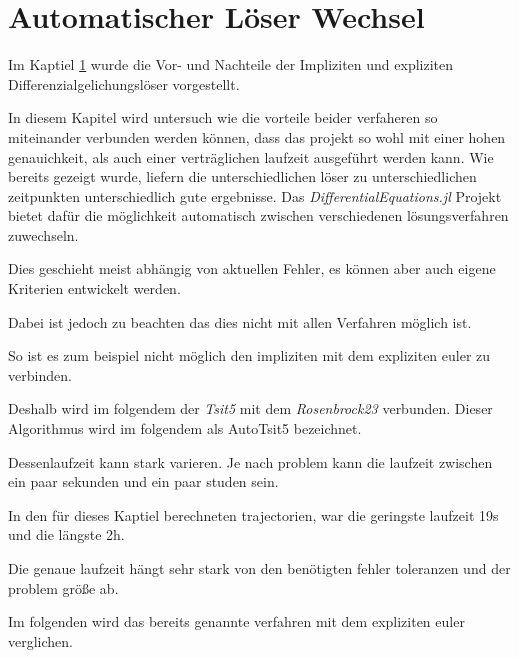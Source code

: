 

\section{Automatischer Löser Wechsel}

Im Kaptiel \ref{} wurde die Vor- und Nachteile der Impliziten und expliziten Differenzialgelichungslöser 
vorgestellt.

In diesem Kapitel wird untersuch wie die vorteile beider verfaheren so miteinander verbunden 
werden können, dass das projekt so wohl mit einer hohen genauichkeit, als auch einer verträglichen laufzeit
ausgeführt werden kann.
Wie bereits gezeigt wurde, liefern die unterschiedlichen löser zu unterschiedlichen zeitpunkten
unterschiedlich gute ergebnisse.
Das \textit{DifferentialEquations.jl} Projekt bietet dafür die möglichkeit automatisch 
zwischen verschiedenen lösungsverfahren zuwechseln.

Dies geschieht meist abhängig von aktuellen Fehler, es können aber auch eigene Kriterien entwickelt werden.

Dabei ist jedoch zu beachten das dies nicht mit allen Verfahren möglich ist.

So ist es zum beispiel nicht möglich den impliziten mit dem expliziten euler zu verbinden.

Deshalb wird im folgendem der \textit{Tsit5} mit dem \textit{Rosenbrock23} verbunden. Dieser Algorithmus wird im folgendem als AutoTsit5 bezeichnet.

Dessenlaufzeit kann stark varieren. Je nach problem kann die laufzeit zwischen ein paar sekunden und
ein paar studen sein.

In den für dieses Kaptiel berechneten trajectorien, war die geringste laufzeit 19s und die längste 2h.

Die genaue laufzeit hängt sehr stark von den benötigten fehler toleranzen und der problem größe ab.

Im folgenden wird das bereits genannte verfahren mit dem expliziten euler verglichen.

